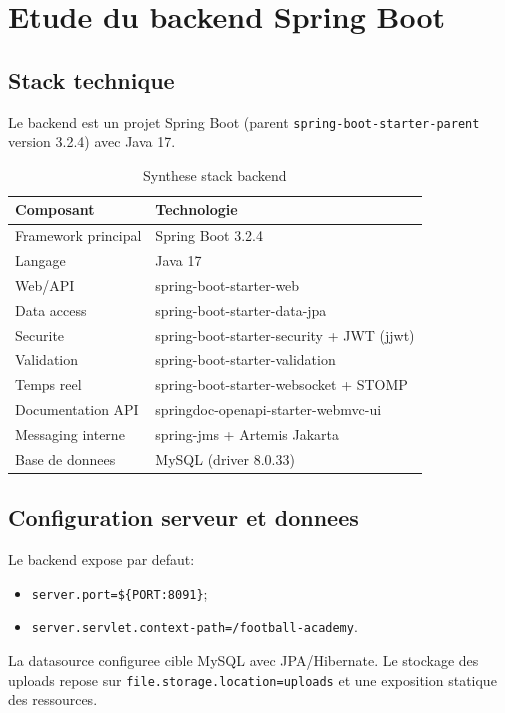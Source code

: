 \chapter{Etude du backend Spring Boot}

\section{Stack technique}

Le backend est un projet Spring Boot (parent \texttt{spring-boot-starter-parent} version 3.2.4) avec Java 17.

\begin{table}[H]
\centering
\begin{tabular}{p{} p{}}
\toprule
\textbf{Composant} & \textbf{Technologie} \\
\midrule
Framework principal & Spring Boot 3.2.4 \\
Langage & Java 17 \\
Web/API & spring-boot-starter-web \\
Data access & spring-boot-starter-data-jpa \\
Securite & spring-boot-starter-security + JWT (jjwt) \\
Validation & spring-boot-starter-validation \\
Temps reel & spring-boot-starter-websocket + STOMP \\
Documentation API & springdoc-openapi-starter-webmvc-ui \\
Messaging interne & spring-jms + Artemis Jakarta \\
Base de donnees & MySQL (driver 8.0.33) \\
\bottomrule
\end{tabular}
\caption{Synthese stack backend}
\end{table}

\section{Configuration serveur et donnees}

Le backend expose par defaut:
\begin{itemize}[leftmargin=*]
  \item \texttt{server.port=\$\{PORT:8091\}};
  \item \texttt{server.servlet.context-path=/football-academy}.
\end{itemize}

La datasource configuree cible MySQL avec JPA/Hibernate. Le stockage des uploads repose sur \texttt{file.storage.location=uploads} et une exposition statique des ressources.

